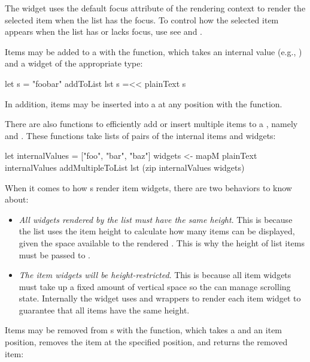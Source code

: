 The  widget uses the default focus attribute of the rendering context
to render the selected item when the list has the focus.  To control how the
selected item appears when the list has or lacks focus, use see
 and
.

Items may be added to a  with the  function,
which takes an internal value (e.g., ) and a widget of the
appropriate type:

\begin{haskellcode}
 let s = "foobar"
 addToList lst s =<< plainText s
\end{haskellcode}

In addition, items may be inserted into a  at any position with
the  function.

There are also functions to efficiently add or insert multiple items to a
, namely  and . These
functions take lists of pairs of the internal items and widgets:

\begin{haskellcode}
  let internalValues = ["foo", "bar", "baz"]
  widgets <- mapM plainText internalValues
  addMultipleToList lst (zip internalValues widgets)
\end{haskellcode}

When it comes to how s render item widgets, there are two behaviors to
know about:

\begin{itemize}
\item \textit{All widgets rendered by the list must have the same height}.
  This is because the list uses the item height to calculate how many
  items can be displayed, given the space available to the rendered .
  This is why the height of list items must be passed to .
\item \textit{The item widgets will be height-restricted}.  This is because all
   item widgets must take up a fixed amount of vertical space so the
   can manage scrolling state.  Internally the  widget uses
   and  wrappers to render each item widget to guarantee
  that all items have the same height.
\end{itemize}

Items may be removed from s with the 
function, which takes a  and an item position,
removes the item at the specified position, and returns the removed
item:

